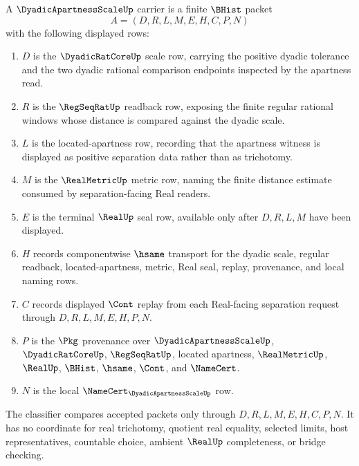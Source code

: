 \begin{definition}
\label{def:dyadic-apartness-scale-carrier}
A $\DyadicApartnessScaleUp$ carrier is a finite $\BHist$ packet
$$
A=(D,R,L,M,E,H,C,P,N)
$$
with the following displayed rows:
\begin{enumerate}
\item $D$ is the $\DyadicRatCoreUp$ scale row, carrying the positive dyadic tolerance and the two dyadic rational comparison endpoints inspected by the apartness read.
\item $R$ is the $\RegSeqRatUp$ readback row, exposing the finite regular rational windows whose distance is compared against the dyadic scale.
\item $L$ is the located-apartness row, recording that the apartness witness is displayed as positive separation data rather than as trichotomy.
\item $M$ is the $\RealMetricUp$ metric row, naming the finite distance estimate consumed by separation-facing Real readers.
\item $E$ is the terminal $\RealUp$ seal row, available only after $D,R,L,M$ have been displayed.
\item $H$ records componentwise $\hsame$ transport for the dyadic scale, regular readback, located-apartness, metric, Real seal, replay, provenance, and local naming rows.
\item $C$ records displayed $\Cont$ replay from each Real-facing separation request through $D,R,L,M,E,H,P,N$.
\item $P$ is the $\Pkg$ provenance over $\DyadicApartnessScaleUp$, $\DyadicRatCoreUp$, $\RegSeqRatUp$, located apartness, $\RealMetricUp$, $\RealUp$, $\BHist$, $\hsame$, $\Cont$, and $\NameCert$.
\item $N$ is the local $\NameCert_{\DyadicApartnessScaleUp}$ row.
\end{enumerate}
The classifier compares accepted packets only through $D,R,L,M,E,H,C,P,N$. It has no coordinate for real trichotomy, quotient real equality, selected limits, host representatives, countable choice, ambient $\RealUp$ completeness, or bridge checking.
\end{definition}

